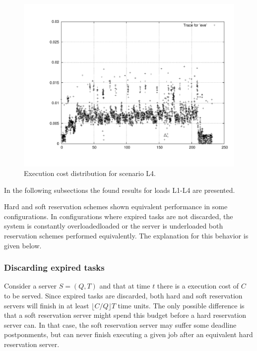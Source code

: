 \documentclass[times, 10pt,twocolumn]{article}
\begin{document}
\begin{figure}[h!t]
  \centering
  \includegraphics[scale=0.31]{trace-eve}
  \caption{Execution cost distribution for scenario L4.}
  \label{fig:plotl4}
\end{figure}

In the following subsections the found results for loads L1-L4 are presented. 

\label{sec:noDifference}

Hard and soft reservation schemes shown equivalent performance in some
configurations. In configurations where expired tasks are not
discarded, the system is constantly overloadedloaded or the server is
underloaded both reservation schemes performed equivalently. The
explanation for this behavior is given below.

\subsubsection{Discarding expired tasks}
\label{sec:disc-expir-tasks}

Consider a server $S = (Q,T)$ and that at time $t$ there is a
execution cost of $C$ to be served.  Since expired tasks are
discarded, both hard and soft reservation servers will finish in at
least $\lfloor C/Q \rfloor T$ time units.  The only possible
difference is that a soft reservation server might spend this budget
before a hard reservation server can. In that case, the soft
reservation server may suffer some deadline postponments, but can
never finish executing a given job after an equivalent hard
reservation server.
\end{document}
